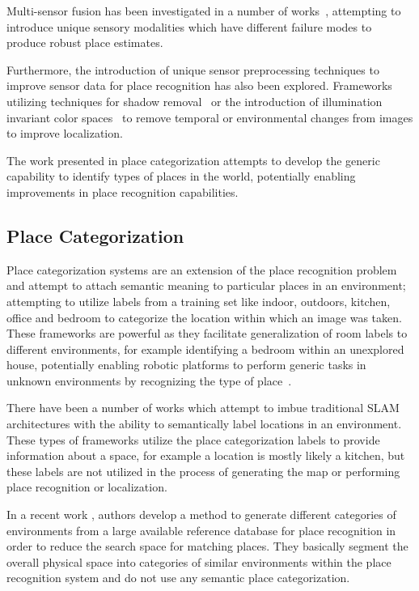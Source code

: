 \documentclass[letterpaper, 10 pt, conference]{ieeeconf}  %
\begin{document}
Multi-sensor fusion has been investigated in a number of works~\cite{tapus2006cognitive,Milford2013a}, attempting to introduce unique sensory modalities which have different failure modes to produce robust place estimates. 

Furthermore, the introduction of unique sensor preprocessing techniques to improve sensor data for place recognition has also been explored. Frameworks utilizing techniques for shadow removal~\cite{corke2013dealing} or the introduction of illumination invariant color spaces~\cite{mcmanus2014shady} to remove temporal or environmental changes from images to improve localization. 

The work presented in place categorization attempts to develop the generic capability to identify types of places in the world, potentially enabling improvements in place recognition capabilities. 


\subsection{Place Categorization}

Place categorization systems are an extension of the place recognition problem and attempt to attach semantic meaning to particular places in an environment; attempting to utilize labels from a training set like indoor, outdoors, kitchen, office and bedroom to categorize the location within which an image was taken. These frameworks are powerful as they facilitate generalization of room labels to different environments, for example identifying a bedroom within an unexplored house, potentially enabling robotic platforms to perform generic tasks in unknown environments by recognizing the type of place~\cite{wu2009visual}. 

There have been a number of works which attempt to imbue traditional SLAM architectures with the ability to semantically label locations in an environment\cite{sunderhauf2016place, ranganathan2011visual}. These types of frameworks utilize the place categorization labels to provide information about a space, for example a location is mostly likely a kitchen, but these labels are not utilized in the process of generating the map or performing place recognition or localization. 

In a recent work \cite{mohan2015environment}, authors develop a method to generate different categories of environments from a large available reference database for place recognition in order to reduce the search space for matching places. They basically segment the overall physical space into categories of similar environments within the place recognition system and do not use any semantic place categorization.
\end{document}
